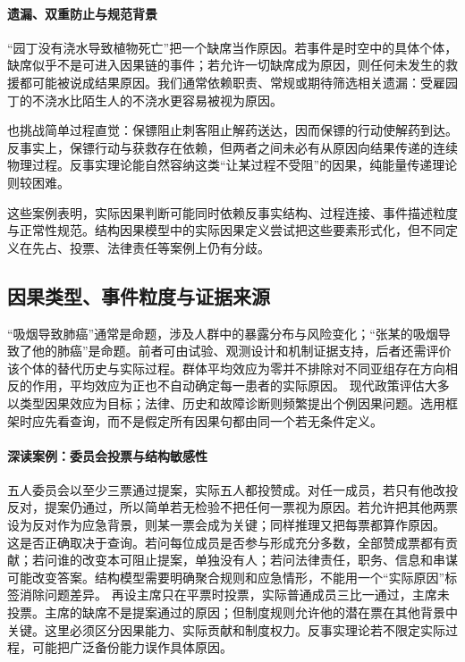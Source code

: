 \paragraph{遗漏、双重防止与规范背景}

“园丁没有浇水导致植物死亡”把一个缺席当作原因。若事件是时空中的具体个体，缺席似乎不是可进入因果链的事件；若允许一切缺席成为原因，则任何未发生的救援都可能被说成结果原因。我们通常依赖职责、常规或期待筛选相关遗漏：受雇园丁的不浇水比陌生人的不浇水更容易被视为原因。

也挑战简单过程直觉：保镖阻止刺客阻止解药送达，因而保镖的行动使解药到达。反事实上，保镖行动与获救存在依赖，但两者之间未必有从原因向结果传递的连续物理过程。反事实理论能自然容纳这类“让某过程不受阻”的因果，纯能量传递理论则较困难。

这些案例表明，实际因果判断可能同时依赖反事实结构、过程连接、事件描述粒度与正常性规范。结构因果模型中的实际因果定义尝试把这些要素形式化，但不同定义在先占、投票、法律责任等案例上仍有分歧。

\subsection{因果类型、事件粒度与证据来源}

“吸烟导致肺癌”通常是命题，涉及人群中的暴露分布与风险变化；“张某的吸烟导致了他的肺癌”是命题。前者可由试验、观测设计和机制证据支持，后者还需评价该个体的替代历史与实际过程。群体平均效应为零并不排除对不同亚组存在方向相反的作用，平均效应为正也不自动确定每一患者的实际原因。
现代政策评估大多以类型因果效应为目标；法律、历史和故障诊断则频繁提出个例因果问题。选用框架时应先看查询，而不是假定所有因果句都由同一个若无条件定义。

\paragraph{深读案例：委员会投票与结构敏感性}

五人委员会以至少三票通过提案，实际五人都投赞成。对任一成员，若只有他改投反对，提案仍通过，所以简单若无检验不把任何一票视为原因。若允许把其他两票设为反对作为应急背景，则某一票会成为关键；同样推理又把每票都算作原因。
这是否正确取决于查询。若问每位成员是否参与形成充分多数，全部赞成票都有贡献；若问谁的改变本可阻止提案，单独没有人；若问法律责任，职务、信息和串谋可能改变答案。结构模型需要明确聚合规则和应急情形，不能用一个“实际原因”标签消除问题差异。
再设主席只在平票时投票，实际普通成员三比一通过，主席未投票。主席的缺席不是提案通过的原因；但制度规则允许他的潜在票在其他背景中关键。这里必须区分因果能力、实际贡献和制度权力。反事实理论若不限定实际过程，可能把广泛备份能力误作具体原因。

